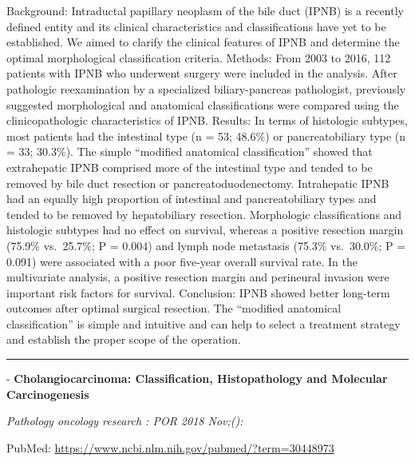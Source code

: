 \documentclass[]{article}
\begin{document}
Background: Intraductal papillary neoplasm of the bile duct (IPNB) is a
recently defined entity and its clinical characteristics and
classifications have yet to be established. We aimed to clarify the
clinical features of IPNB and determine the optimal morphological
classification criteria. Methods: From 2003 to 2016, 112 patients with
IPNB who underwent surgery were included in the analysis. After
pathologic reexamination by a specialized biliary-pancreas pathologist,
previously suggested morphological and anatomical classifications were
compared using the clinicopathologic characteristics of IPNB. Results:
In terms of histologic subtypes, most patients had the intestinal type
(n = 53; 48.6\%) or pancreatobiliary type (n = 33; 30.3\%). The simple
``modified anatomical classification'' showed that extrahepatic IPNB
comprised more of the intestinal type and tended to be removed by bile
duct resection or pancreatoduodenectomy. Intrahepatic IPNB had an
equally high proportion of intestinal and pancreatobiliary types and
tended to be removed by hepatobiliary resection. Morphologic
classifications and histologic subtypes had no effect on survival,
whereas a positive resection margin (75.9\% vs.~25.7\%; P = 0.004) and
lymph node metastasis (75.3\% vs.~30.0\%; P = 0.091) were associated
with a poor five-year overall survival rate. In the multivariate
analysis, a positive resection margin and perineural invasion were
important risk factors for survival. Conclusion: IPNB showed better
long-term outcomes after optimal surgical resection. The ``modified
anatomical classification'' is simple and intuitive and can help to
select a treatment strategy and establish the proper scope of the
operation.

{}

{}

\begin{center}\rule{0.5\linewidth}{\linethickness}\end{center}

 - \textbf{Cholangiocarcinoma: Classification, Histopathology and
Molecular Carcinogenesis}

\emph{Pathology oncology research : POR 2018 Nov;():}

PubMed: \url{https://www.ncbi.nlm.nih.gov/pubmed/?term=30448973}
\end{document}
